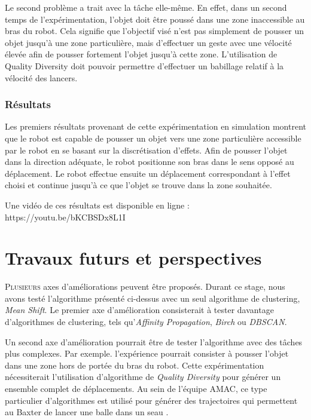 \documentclass[draft]{llncs}
\begin{document}
Le second problème a trait avec la tâche elle-même.
En effet, dans un second temps de l'expérimentation, l'objet doit être poussé dans une zone inaccessible au bras du robot.
Cela signifie que l'objectif visé n'est pas simplement de pousser  un objet jusqu'à une zone particulière, mais d'effectuer un geste avec une vélocité élevée afin de pousser fortement l'objet jusqu'à cette zone.
L'utilisation de Quality Diversity doit pouvoir permettre d'effectuer un babillage relatif à la vélocité des lancers.





\subsubsection{Résultats}

Les premiers résultats provenant de cette expérimentation en simulation montrent que le robot est capable de pousser un objet vers une zone particulière accessible par le robot en se basant sur la discrétisation d'effets.
Afin de pousser l'objet dans la direction adéquate, le robot positionne son bras dans le sens opposé au déplacement.
Le robot effectue ensuite un déplacement correspondant à l'effet choisi et continue jusqu'à ce que l'objet se trouve dans la zone souhaitée.

Une vidéo de ces résultats est disponible en ligne : https://youtu.be/bKCBSDx8L1I





\section{Travaux futurs et perspectives}

\lettrine{P}{lusieurs} axes d'améliorations peuvent être proposés.
Durant ce stage, nous avons testé l'algorithme présenté ci-dessus avec un seul algorithme de clustering, \textit{Mean Shift}.
Le premier axe d'amélioration consisterait à tester davantage d'algorithmes de clustering, tels qu'\textit{Affinity Propagation}, \textit{Birch} ou \textit{DBSCAN}.

Un second axe d'amélioration pourrait être de tester l'algorithme avec des tâches plus complexes.
Par exemple. l'expérience pourrait consister à pousser l'objet dans une zone hors de portée du bras du robot.
Cette expérimentation nécessiterait l'utilisation d'algorithme de \textit{Quality Diversity} \cite{Pugh2016} pour générer un ensemble complet de déplacements.
Au sein de l'équipe AMAC, ce type particulier d'algorithmes est utilisé pour générer des trajectoires qui permettent au Baxter de lancer une balle dans un seau \cite{Kim2017}. 
\end{document}
